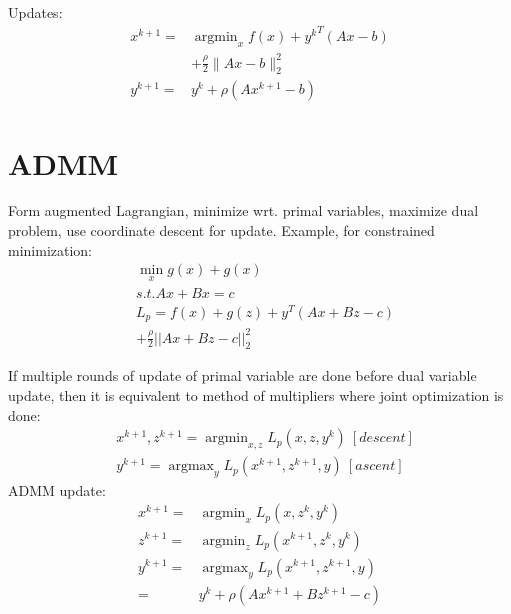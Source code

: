 \documentclass[8pt]{report}
\DeclareMathOperator*{\argmin}{argmin}
\DeclareMathOperator*{\argmax}{argmax}
\newcommand{\norm}[1]{\|#1\|}
\begin{document}
\begin{multicols*}{2}
  Updates:
  \begin{align*}
    x^{k+1} = & \argmin_x f(x) + {y^{k}}^T(Ax-b)\\
                           & + \frac{\rho}{2}\norm{Ax-b}_2^2\\
    y^{k+1} = & y^k + \rho(Ax^{k+1}-b)
  \end{align*}

  \vfill\null
  \columnbreak
  
  \section{ADMM}

  Form augmented Lagrangian, minimize wrt. primal variables, maximize dual problem, use coordinate descent for update. Example, for constrained minimization:
  \begin{align*}
    & \min_x g(x) + g(x)\\
    & s.t. Ax + Bx = c\\
    & L_p = f(x) + g(z) + y^T(Ax+Bz-c)\\
    & + \frac{\rho}{2} ||Ax+Bz-c||_2^2
  \end{align*}
  
  If multiple rounds of update of primal variable are done before dual variable update, then it is equivalent to method of multipliers where joint optimization is done:
  \begin{align*}
    &x^{k+1}, z^{k+1} = \argmin_{x,z} L_p(x,z,y^k)\ [descent]\\
    &y^{k+1} = \argmax_{y} L_p(x^{k+1},z^{k+1},y)\ [ascent]
  \end{align*}
  ADMM update:
  \begin{align*}
    x^{k+1} = & \argmin_{x} L_p(x,z^k,y^k)\\
    z^{k+1} = & \argmin_{z} L_p(x^{k+1},z^k,y^k)\\
    y^{k+1} = & \argmax_{y} L_p(x^{k+1},z^{k+1},y)\\
              = & y^k + \rho(Ax^{k+1} + Bz^{k+1} -c)
  \end{align*}


\end{multicols*}
\end{document}

